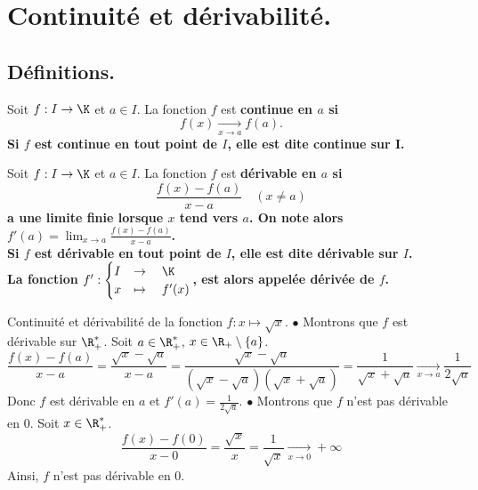 \documentclass[11pt]{article}
\begin{document}
\section{Continuité et dérivabilité.}

\subsection{Définitions.}

\begin{defi}{}{}
    Soit $f:I\to\K$ et $a\in I$. La fonction $f$ est \bf{continue} en $a$ si
    \begin{equation*}
        f(x)\xrightarrow[x\to a]{}f(a).
    \end{equation*} 
    Si $f$ est continue en tout point de $I$, elle est dite \bf{continue sur} I.
\end{defi}

\begin{defi}{}{}
    Soit $f:I\to\K$ et $a\in I$. La fonction $f$ est \bf{dérivable} en $a$ si
    \begin{equation*}
        \frac{f(x)-f(a)}{x-a}\quad(x\neq a)
    \end{equation*}
    a une limite finie lorsque $x$ tend vers $a$. On note alors $f'(a)=\lim_{x\to a}\frac{f(x)-f(a)}{x-a}$.\\
    Si $f$ est dérivable en tout point de $I$, elle est dite \bf{dérivable} sur $I$.\\
    La fonction $f':\begin{cases}I&\to\quad\K\\x&\mapsto\quad f'(x)\end{cases}$, est alors appelée \bf{dérivée} de $f$.
\end{defi}

\begin{ex}{}{}
    Continuité et dérivabilité de la fonction $f:x\mapsto\sqrt{x}$.
    \tcblower
    $\bullet$ Montrons que $f$ est dérivable sur $\R_+^*$. Soit $a\in\R_+^*$, $x\in\R_+\setminus\{a\}$.
    \begin{equation*}
        \frac{f(x)-f(a)}{x-a}=\frac{\sqrt{x}-\sqrt{a}}{x-a}=\frac{\sqrt{x}-\sqrt{a}}{(\sqrt{x}-\sqrt{a})(\sqrt{x}+\sqrt{a})}=\frac{1}{\sqrt{x}+\sqrt{a}}\xrightarrow[x\to a]{}\frac{1}{2\sqrt{a}}
    \end{equation*}
    Donc $f$ est dérivable en $a$ et $f'(a)=\frac{1}{2\sqrt{a}}$.\n
    $\bullet$ Montrons que $f$ n'est pas dérivable en 0. Soit $x\in\R_+^*$.
    \begin{equation*}
        \frac{f(x)-f(0)}{x-0}=\frac{\sqrt{x}}{x}=\frac{1}{\sqrt{x}}\xrightarrow[x\to0]{}+\infty
    \end{equation*}
    Ainsi, $f$ n'est pas dérivable en 0.
\end{ex}
\end{document}
